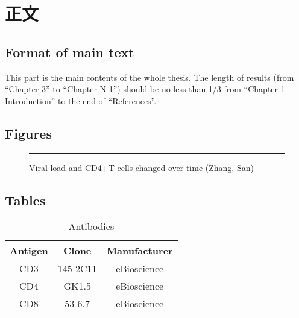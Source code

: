 \documentclass[degree=doctor, language=english, format=medical]{thuthesis}
\begin{document}
\START
\showoutput

\copyrightpage


\mainmatter

\chapter{正文}

\section{Format of main text}

This part is the main contents of the whole thesis. The length of results (from “Chapter 3” to “Chapter N-1”) should be no less than 1/3 from “Chapter 1 Introduction” to the end of ``References''.


\section{Figures}

\begin{figure}[htb]
  \centering
  \rule{1cm}{1cm}
  \caption{Viral load and CD4+T cells changed over time (Zhang, San)}
\end{figure}


\section{Tables}

\begin{table}[htb]
  \centering
  \caption{Antibodies}
  \begin{tabular}{ccc}
    \toprule
    Antigen & Clone    & Manufacturer \\
    \midrule
    CD3     & 145-2C11 & eBioscience \\
    CD4     & GK1.5    & eBioscience \\
    CD8     & 53-6.7   & eBioscience \\
    \bottomrule
  \end{tabular}
\end{table}


\clearpage
\OMIT
\end{document}
